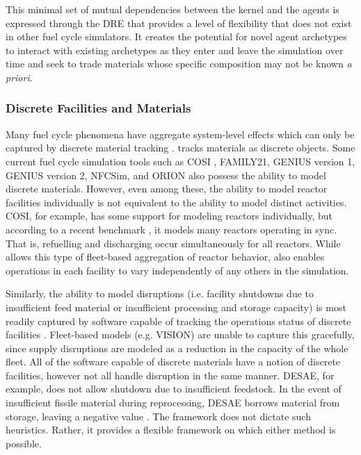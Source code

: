 This minimal set of mutual dependencies between the kernel and the agents is
expressed through the \gls{DRE} that provides a level of flexibility that does
not exist in other fuel cycle simulators.  It creates the potential for novel
agent archetypes to interact with existing archetypes as they enter and leave
the simulation over time and seek to trade materials whose specific
composition may not be known \textit{a priori}.

\subsubsection{Discrete Facilities and Materials}

Many fuel cycle phenomena have aggregate system-level effects which can only be
captured by discrete material tracking \cite{huff_next_2010}.  \Cyclus
tracks materials as discrete objects. Some current fuel cycle simulation tools
such as \gls{COSI}
\cite{mccarthy_benchmark_2012,grasso_nea-wpfc/fcts_2009,guerin_benchmark_2009},
FAMILY21\cite{mccarthy_benchmark_2012},
\gls{GENIUS} version 1, \gls{GENIUS} version 2, \gls{NFCSim}, and ORION also
possess the ability to model discrete materials. However, even among these, the ability to model reactor facilities individually is not equivalent to the ability to model distinct activities. \gls{COSI}, for example,
has some support for modeling reactors individually, but according to a recent benchmark \cite{oecd_benchmark_2012}, it models many reactors operating in sync. That is, refuelling and discharging occur simultaneously for all reactors.
While \Cyclus allows this type of fleet-based aggregation of reactor behavior, \Cyclus also enables operations in each facility to vary independently of any others in the simulation.

Similarly, the ability to model disruptions (i.e. facility shutdowns due to
insufficient feed material or insufficient processing and storage capacity) is
most readily captured by software capable of tracking the operations status of
discrete facilities \cite{huff_next_2010}.  Fleet-based models (e.g.
\gls{VISION}) are unable to capture this gracefully, since supply disruptions
are modeled as a reduction in the capacity of the whole fleet.  All of the
software capable of discrete materials have a notion of discrete facilities,
however not all handle disruption in the same manner. \gls{DESAE}, for example,
does not allow shutdown due to insufficient feedstock. In the event of
insufficient fissile material during reprocessing, \gls{DESAE} borrows material
from storage, leaving a negative value \cite{mccarthy_benchmark_2012}.  The
\Cyclus framework does not dictate such heuristics. Rather, it provides a
flexible framework on which either method is possible.


